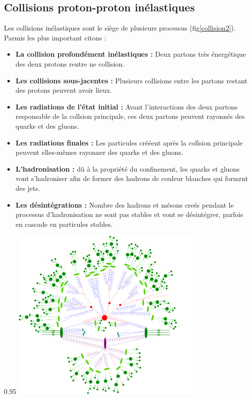 \subsection{Collisions proton-proton inélastiques}
Les collisions inélastiques sont le siège de plusieurs processus (fig\ref{collision2}). Parmis les plus important citons :
\begin{itemize}[label=$\bullet$]
	\item \textbf{La collision profondément inélastiques :} Deux partons très énergétique des deux protons rentre ne collision.
	\item \textbf{Les collisions sous-jacentes :} Plusieurs collisions entre les partons restant des protons peuvent avoir lieux.
	\item \textbf{Les radiations de l'état initial :} Avant l'interactions des deux partons responsable de la collsion principale, ces deux partons peuvent rayonnés des quarks et des gluons.
	\item \textbf{Les radiations finales :} Les particules crééent après la collsion principale peuvent elles-mêmes rayonner des quarks et des gluons.
	\item \textbf{L'hadronisation :} dû à la propriété du confinement, les quarks et gluons vont s'hadroniser afin de former des hadrons de couleur blanches qui formrnt des jets.
	\item \textbf{Les désintégrations :} Nombre des hadrons et mésons creés pendant le processus d'hadronisation ne sont pas stables et vont se désintégrer, parfois en cascade en particules stables.
\end{itemize}

\begin{minipagewithmarginpars}[h]{0.95\textwidth}
	\centering
	\includegraphics[width=0.7\textwidth]{LHC/event.jpg}
	\label{collision2}	
\end{minipagewithmarginpars}

